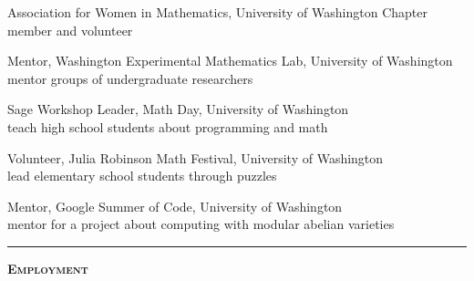 \documentclass[12pt]{article}
\newcommand{\sectionheading}[1]
{
\bigskip %
\noindent
\hspace{-6.5mm}\textcolor{Gray}{\rule[.75mm]{21.5mm}{1mm}} %
\hspace{.2mm}	%
{\large{\textbf{\textsc{#1}}}} %
}
\newenvironment{date_section}
	{
	\vspace{-1ex}
	\leftmargini = 15ex
		\begin{itemize}[
			labelsep = *,
			labelwidth = 9ex,
			labelindent = 0ex,
			itemindent = !,
			font=\normalfont,
			align=parleft
		]{}
		\itemsep=-1.5mm
	}
	{\end{itemize}\vspace{-2ex}}
\newcommand{\yearmo}[2]{
	\item[
		{\makebox[1ex][r]{#1}}
		\hspace{1ex}
		{\makebox[1ex][l]{#2} }
		] }
\newcommand{\yearrange}[2]{
	\item[
		{\makebox[1ex][r]{#1}}
		--
		{\makebox[1ex][l]{#2} }
		] }
\begin{document}
		\begin{date_section}
			
			\yearrange{2015}{2018}
				Association for Women in Mathematics,
				University of Washington Chapter
				\\ member and volunteer
			
			\yearrange{2016}{2017}
				Mentor,
				Washington Experimental Mathematics Lab,
				University of Washington
				\\ mentor groups of undergraduate researchers
				
			\yearmo{}{2017} %
				Sage Workshop Leader,
				Math Day,
				University of Washington
				\\ teach high school students about programming and math
				
			\yearmo{}{2017} %
				Volunteer,
				Julia Robinson Math Festival,
				University of Washington
				\\ lead elementary school students through puzzles

			\yearmo{}{2016} %
				Mentor,
				Google Summer of Code,
				University of Washington
				\\ mentor for a project about computing with modular abelian varieties

%			
%
%
%
%

		\end{date_section}


	\sectionheading{Employment}%
	
\end{document}
